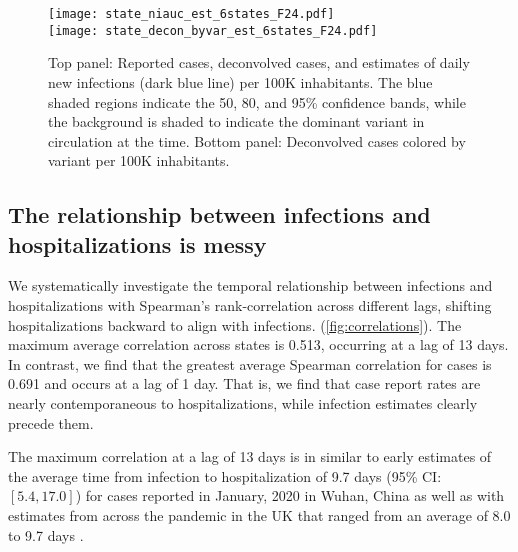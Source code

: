 \begin{figure}[!tb]
\centering
    \texttt{[image: state\_niauc\_est\_6states\_F24.pdf]}\\
    \texttt{[image: state\_decon\_byvar\_est\_6states\_F24.pdf]}
    \caption{Top panel: Reported cases, deconvolved cases, and estimates of daily new infections (dark blue
    line) per 100K inhabitants. The blue shaded regions indicate the 50, 80, and 95\% confidence
    bands, while the background is shaded to indicate the dominant variant in
    circulation at the time.  
    Bottom panel: Deconvolved cases colored by variant per 100K inhabitants. }
    \label{fig:six-states}
\end{figure}


\subsection{The relationship between infections and hospitalizations is messy}
\label{sec:lagged-correlations}

 We systematically investigate the
temporal relationship between infections and hospitalizations with Spearman's
rank-correlation across different lags, shifting hospitalizations backward to
align with infections. (\autoref{fig:correlations}). The maximum average
correlation across states is 0.513, occurring at a lag of 13 days. In contrast,
we find that the greatest average Spearman correlation for cases is 0.691 and
occurs at a lag of 1 day. That is, we find that case report rates are nearly
contemporaneous to hospitalizations, while infection estimates clearly precede
them. 

The maximum correlation at a lag of 13 days is in similar to early estimates of the average time from
infection to hospitalization of 9.7 days (95\% CI: $[5.4, 17.0]$) for cases
reported in January, 2020 in Wuhan, China as well as with estimates from across
the pandemic in the UK that ranged from an average of 8.0 to 9.7 days
\citep{ward2021understanding}. 

